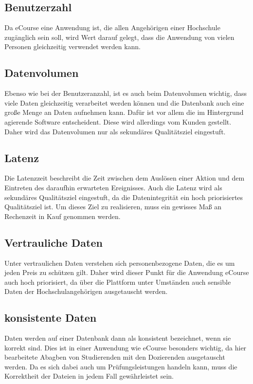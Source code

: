 \subsection{Benutzerzahl}
Da eCourse eine Anwendung ist, die allen Angehörigen einer Hochschule zugänglich sein soll, wird Wert darauf gelegt, dass die Anwendung von vielen Personen gleichzeitig verwendet werden kann.

\subsection{Datenvolumen}
Ebenso wie bei der Benutzeranzahl, ist es auch beim Datenvolumen wichtig, dass viele Daten gleichzeitig verarbeitet werden können und die Datenbank auch eine große Menge an Daten aufnehmen kann. Dafür ist vor allem die im Hintergrund agierende Software entscheident. Diese wird allerdings vom Kunden gestellt. Daher wird das Datenvolumen nur als sekundäres Qualitätsziel eingestuft.

\subsection{Latenz}
Die Latenzzeit beschreibt die Zeit zwischen dem Auslösen einer Aktion und dem Eintreten des daraufhin erwarteten Ereignisses.
Auch die Latenz wird als sekundäres Qualitätsziel eingestuft, da die Datenintegrität ein hoch priorisiertes Qualitätsziel ist. Um dieses Ziel zu realisieren, muss ein gewisses Maß an Rechenzeit in Kauf genommen werden.

\subsection{Vertrauliche Daten}
Unter vertraulichen Daten verstehen sich personenbezogene Daten, die es um jeden Preis zu schützen gilt. Daher wird dieser Punkt für die Anwendung eCourse auch hoch priorisiert, da über die Plattform unter Umständen auch sensible Daten der Hochschulangehörigen ausgetauscht werden.

\subsection{konsistente Daten}
Daten werden auf einer Datenbank dann als konsistent bezeichnet, wenn sie korrekt sind. Dies ist in einer Anwendung wie eCourse besonders wichtig, da hier \gls{bearbeitete Abagbe}n von \gls{Studierende}n mit den \gls{Dozierende}n ausgetauscht werden. Da es sich dabei auch um Prüfungsleistungen handeln kann, muss die Korrektheit der Dateien in jedem Fall gewährleistet sein.